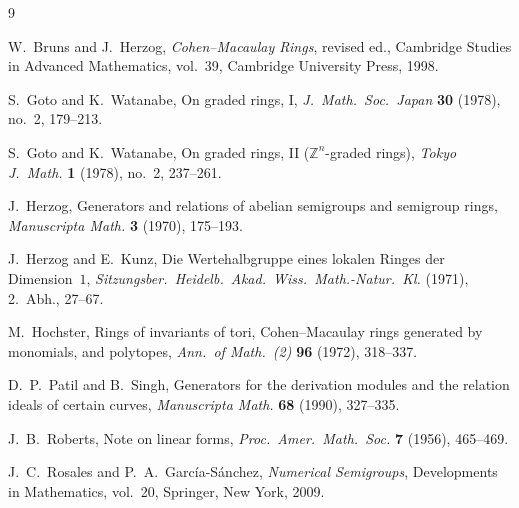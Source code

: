 \documentclass[11pt]{article}
\theoremstyle{definition}
\theoremstyle{remark}
\begin{document}
\begin{thebibliography}{9}

W.~Bruns and J.~Herzog, \emph{Cohen--Macaulay Rings}, revised ed., Cambridge Studies in Advanced Mathematics, vol.~39, Cambridge University Press, 1998.

S.~Goto and K.~Watanabe, On graded rings, I, \emph{J.\ Math.\ Soc.\ Japan} \textbf{30} (1978), no.~2, 179--213.

S.~Goto and K.~Watanabe, On graded rings, II ($\mathbb{Z}^n$-graded rings), \emph{Tokyo J.\ Math.} \textbf{1} (1978), no.~2, 237--261.

J.~Herzog, Generators and relations of abelian semigroups and semigroup rings, \emph{Manuscripta Math.} \textbf{3} (1970), 175--193.

J.~Herzog and E.~Kunz, Die Wertehalbgruppe eines lokalen Ringes der Dimension~$1$, \emph{Sitzungsber.\ Heidelb.\ Akad.\ Wiss.\ Math.-Natur.\ Kl.} (1971), 2.~Abh., 27--67.

M.~Hochster, Rings of invariants of tori, Cohen--Macaulay rings generated by monomials, and polytopes, \emph{Ann.\ of Math.\ (2)} \textbf{96} (1972), 318--337.

D.~P.~Patil and B.~Singh, Generators for the derivation modules and the relation ideals of certain curves, \emph{Manuscripta Math.} \textbf{68} (1990), 327--335.

J.~B.~Roberts, Note on linear forms, \emph{Proc.\ Amer.\ Math.\ Soc.} \textbf{7} (1956), 465--469.

J.~C.~Rosales and P.~A.~Garc\'ia-S\'anchez, \emph{Numerical Semigroups}, Developments in Mathematics, vol.~20, Springer, New York, 2009.

\end{thebibliography}
\end{document}
